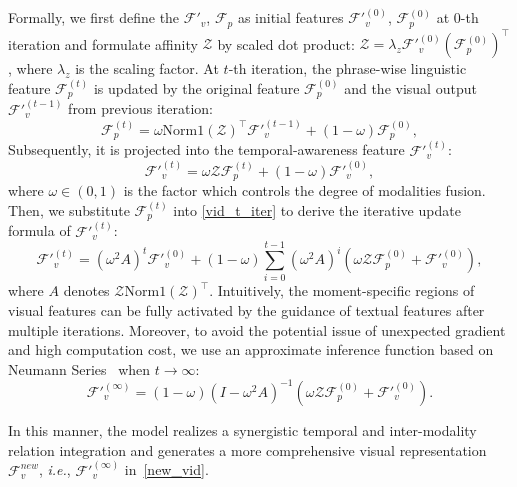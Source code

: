 \documentclass[10pt,twocolumn,letterpaper]{article}
\begin{document}
Formally, we first define the $\mathcal{F'}_v$, $\mathcal{F}_p$ as initial features $\mathcal{F'}_v^{(0)}$, $\mathcal{F}_p^{(0)}$ at $0$-th iteration and formulate affinity $\mathcal{Z}$ by scaled dot product: $\mathcal{Z}=\lambda_{z}\mathcal{F'}_v^{(0)} (\mathcal{F}_p^{(0)})^{\top }$, where $\lambda_{z}$ is the scaling factor.
At $t$-th iteration, the phrase-wise linguistic feature $\mathcal{F}_p^{(t)}$ is updated by the original feature $\mathcal{F}_p^{(0)}$ and the visual output $\mathcal{F'}_v^{(t-1)}$ from previous iteration: 
\begin{equation}
    \label{txt_t_iter}
    \mathcal{F}_p^{(t)}=\omega \mathrm{Norm1}(\mathcal{Z})^{\top }\mathcal{F'}_v^{(t-1)}+(1-\omega )\mathcal{F}_p^{(0)},
\end{equation}
Subsequently, it is projected into the temporal-awareness feature $\mathcal{F'}_{v}^{(t)}$:
\begin{equation}
    \label{vid_t_iter}
    \mathcal{F'}_v^{(t)}=\omega \mathcal{Z}\mathcal{F}_p^{(t)} + (1-\omega )\mathcal{F'}_v^{(0)},
\end{equation}
where $\omega \in (0,1)$ is the factor which controls the degree of modalities fusion.
Then, we substitute $\mathcal{F}_p^{(t)}$ into \cref{vid_t_iter} to derive the iterative update formula of $\mathcal{F'}_v^{(t)}$:
\begin{equation}
    \mathcal{F'}_v^{(t)} = (\omega^2A)^{t} \mathcal{F'}_v^{(0)} + (1-\omega )\sum_{i=0}^{t-1} (\omega^2A)^{i}(\omega \mathcal{Z}\mathcal{F}_p^{(0)}+\mathcal{F'}_v^{(0)}),
\end{equation}
where $A$ denotes $\mathcal{Z}\mathrm{Norm1}(\mathcal{Z})^{\top}$. Intuitively, the moment-specific regions of visual features can be fully activated by the guidance of textual features after multiple iterations.
Moreover, to avoid the potential issue of unexpected gradient and high computation cost, we use an approximate inference function based on Neumann Series~\cite{neuman} when $t \to \infty$:
\begin{equation}
    \label{new_vid}
    \mathcal{F'}_v^{(\infty )}=(1-\omega )(I-\omega ^2 A)^{-1}(\omega \mathcal{Z} \mathcal{F}_p^{(0)}+ \mathcal{F'}_v^{(0)}).
\end{equation}

In this manner, the model realizes a synergistic temporal and inter-modality relation integration and generates a more comprehensive visual representation $\mathcal{F}_v^{new}$, \textit{i.e.}, $\mathcal{F'}_v^{(\infty )}$ in~\cref{new_vid}.
\end{document}
